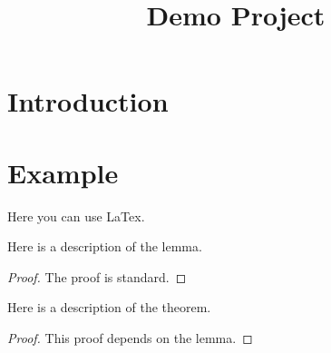 \title{Demo Project}



\maketitle


\tableofcontents
\section{Introduction}



\section{Example}
Here you can use LaTex.

\begin{lemma}\label{lemma:aux}
	\leanok
	Here is a description of the lemma.\cite{Samuel}
\end{lemma}
\begin{proof}
	\leanok
	The proof is standard.
\end{proof}

\begin{theorem}\label{theorem:Ex}
	\leanok
	Here is a description of the theorem.
\end{theorem}
\begin{proof}
	\leanok
	This proof depends on the lemma.
\end{proof}
